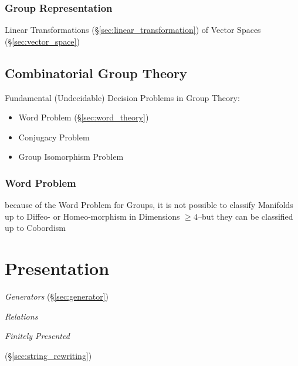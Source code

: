 \subsubsection{Group Representation}\label{sec:group_representation}

Linear Transformations (\S\ref{sec:linear_transformation}) of Vector Spaces
(\S\ref{sec:vector_space})



\subsection{Combinatorial Group Theory}\label{sec:combinatorial_group_theory}

Fundamental (Undecidable) Decision Problems in Group Theory:
\begin{itemize}
  \item Word Problem (\S\ref{sec:word_theory})
  \item Conjugacy Problem
  \item Group Isomorphism Problem
\end{itemize}



\subsubsection{Word Problem}\label{sec:word_problem}

because of the Word Problem for Groups, it is not possible to classify
Manifolds up to Diffeo- or Homeo-morphism in Dimensions $\geq 4$--but they can
be classified up to Cobordism




\section{Presentation}\label{sec:presentation}

\emph{Generators} (\S\ref{sec:generator})

\emph{Relations}

\emph{Finitely Presented}

(\S\ref{sec:string_rewriting})

